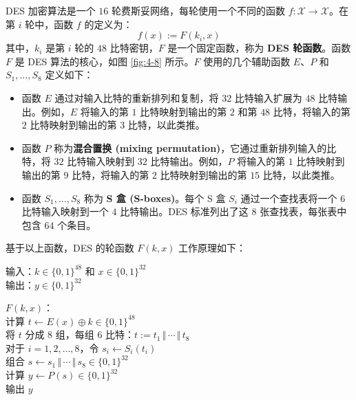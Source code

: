 \begin{snote}
DES 加密算法是一个 $16$ 轮费斯妥网络，每轮使用一个不同的函数 $f:\mathcal{X}\to\mathcal{X}$。在第 $i$ 轮中，函数 $f$ 的定义为：
\[
f(x):=F(k_i,x)
\]
其中，$k_i$ 是第 $i$ 轮的 $48$ 比特密钥，$F$ 是一个固定函数，称为 \textbf{DES 轮函数}。函数 $F$ 是 DES 算法的核心，如图 \ref{fig:4-8} 所示。$F$ 使用的几个辅助函数 $E$、$P$ 和 $S_1,\dots,S_8$ 定义如下：
\begin{itemize}
	\item 函数 $E$ 通过对输入比特的重新排列和复制，将 $32$ 比特输入扩展为 $48$ 比特输出。例如，$E$ 将输入的第 $1$ 比特映射到输出的第 $2$ 和第 $48$ 比特，将输入的第 $2$ 比特映射到输出的第 $3$ 比特，以此类推。
	\item 函数 $P$ 称为\textbf{混合置换 (mixing permutation)}，它通过重新排列输入的比特，将 $32$ 比特输入映射到 $32$ 比特输出。例如，$P$ 将输入的第 $1$ 比特映射到输出的第 $9$ 比特，将输入的第 $2$ 比特映射到输出的第 $15$ 比特，以此类推。
	\item 函数 $S_1,\dots,S_8$ 称为 \textbf{S 盒 (S-boxes)}。每个 S 盒 $S_i$ 通过一个查找表将一个 $6$ 比特输入映射到一个 $4$ 比特输出。DES 标准列出了这 $8$ 张查找表，每张表中包含 $64$ 个条目。
\end{itemize}

\noindent
基于以上函数，DES 的轮函数 $F(k,x)$ 工作原理如下：

\vspace*{5pt}

\hspace*{5pt} 输入：$k\in\{0,1\}^{48}$ 和 $x\in\{0,1\}^{32}$\\
\hspace*{26pt} 输出：$y\in\{0,1\}^{32}$

\vspace*{5pt}

\hspace*{5pt} $F(k,x)$：\\
\hspace*{50pt} 计算 $t\leftarrow E(x)\oplus k\in\{0,1\}^{48}$\\
\hspace*{50pt} 将 $t$ 分成 $8$ 组，每组 $6$ 比特：$t:=t_1\,\Vert\,\cdots\,\Vert\,t_8$\\
\hspace*{50pt} 对于 $i=1,2,\dots,8$，令 $s_i\leftarrow S_i(t_i)$\\
\hspace*{50pt} 组合 $s\leftarrow s_1\,\Vert\,\cdots\,\Vert\,s_8\in\{0,1\}^{32}$\\
\hspace*{50pt} 计算 $y\leftarrow P(s)\in\{0,1\}^{32}$\\
\hspace*{50pt} 输出 $y$


\end{snote}
